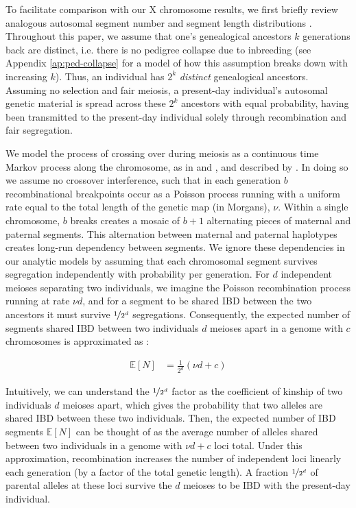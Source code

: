 \documentclass[11pt]{article}
\newcommand{\E}{\mathbb{E}}
\begin{document}
To facilitate comparison with our X chromosome results, we first briefly review
analogous autosomal segment number and segment length distributions
\citep{Donnelly:1983fi,thomas:1994hg,huff2011maximum}. Throughout this paper,
we assume that one's genealogical ancestors $k$ generations back are distinct,
i.e. there is no pedigree collapse due to inbreeding (see Appendix
\ref{ap:ped-collapse} for a model of how this assumption breaks down with
increasing $k$). Thus, an individual has $2^k$ \emph{distinct} genealogical
ancestors. Assuming no selection and fair meiosis, a present-day individual's
autosomal genetic material is spread across these $2^k$ ancestors with equal
probability, having been transmitted to the present-day individual solely
through recombination and fair segregation.

We model the process of crossing over during meiosis as a continuous time
Markov process along the chromosome, as in \textcite{thomas:1994hg} and
\textcite{huff2011maximum}, and described by \textcite{Donnelly:1983fi}. In
doing so we assume no crossover interference, such that in each generation $b$
recombinational breakpoints occur as a Poisson process running with a uniform
rate equal to the total length of the genetic map (in Morgans), $\nu$. Within a
single chromosome, $b$ breaks creates a mosaic of $b+1$ alternating pieces of
maternal and paternal segments. This alternation between maternal and paternal
haplotypes creates long-run dependency between segments. We ignore these
dependencies in our analytic models by assuming that each chromosomal segment
survives segregation independently with probability  per
generation. For $d$ independent meioses separating two individuals, we imagine
the Poisson recombination process running at rate $\nu d$, and for a segment to
be shared IBD between the two ancestors it must survive $\nicefrac{1}{2^d}$
segregations.  Consequently, the expected number of segments shared IBD between
two individuals $d$ meioses apart in a genome with $c$ chromosomes is
approximated as \citep{thomas:1994hg}:

\begin{align}
  \label{eq:exp-n}
  \E[N] &= \frac{1}{2^d} (\nu d + c)
\end{align}

Intuitively, we can understand the $\nicefrac{1}{2^d}$ factor as the
coefficient of kinship \citep[or path
coefficient;][]{wright1922coefficients,wright1934method} of two individuals $d$
meioses apart, which gives the probability that two alleles are shared IBD
between these two individuals. Then, the expected number of IBD segments
$\E[N]$ can be thought of as the average number of alleles shared between two
individuals in a genome with $\nu d + c$ loci total. Under this approximation,
recombination increases the number of independent loci linearly each generation
(by a factor of the total genetic length). A fraction $\nicefrac{1}{2^d}$ of
parental alleles at these loci survive the $d$ meioses to be IBD with the
present-day individual.
\end{document}
